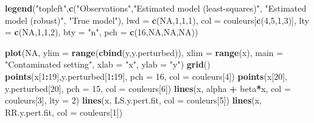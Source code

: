 \documentclass[]{book}
\newenvironment{Shaded}{\begin{snugshade}}{\end{snugshade}}
\newcommand{\DataTypeTok}[1]{\textcolor[rgb]{0.13,0.29,0.53}{#1}}
\newcommand{\DecValTok}[1]{\textcolor[rgb]{0.00,0.00,0.81}{#1}}
\newcommand{\KeywordTok}[1]{\textcolor[rgb]{0.13,0.29,0.53}{\textbf{#1}}}
\newcommand{\NormalTok}[1]{#1}
\newcommand{\OperatorTok}[1]{\textcolor[rgb]{0.81,0.36,0.00}{\textbf{#1}}}
\newcommand{\OtherTok}[1]{\textcolor[rgb]{0.56,0.35,0.01}{#1}}
\newcommand{\StringTok}[1]{\textcolor[rgb]{0.31,0.60,0.02}{#1}}
\theoremstyle{definition}
\theoremstyle{definition}
\theoremstyle{definition}
\theoremstyle{remark}
\begin{document}
{\begin{Shaded}
\begin{Highlighting}[]
\KeywordTok{legend}\NormalTok{(}\StringTok{"topleft"}\NormalTok{,}\KeywordTok{c}\NormalTok{(}\StringTok{"Observations"}\NormalTok{,}\StringTok{"Estimated model (least-squares)"}\NormalTok{,}
                   \StringTok{"Estimated model (robust)"}\NormalTok{, }\StringTok{"True model"}\NormalTok{), }
       \DataTypeTok{lwd =} \KeywordTok{c}\NormalTok{(}\OtherTok{NA}\NormalTok{,}\DecValTok{1}\NormalTok{,}\DecValTok{1}\NormalTok{,}\DecValTok{1}\NormalTok{), }\DataTypeTok{col =}\NormalTok{ couleurs[}\KeywordTok{c}\NormalTok{(}\DecValTok{4}\NormalTok{,}\DecValTok{5}\NormalTok{,}\DecValTok{1}\NormalTok{,}\DecValTok{3}\NormalTok{)],}
       \DataTypeTok{lty =} \KeywordTok{c}\NormalTok{(}\OtherTok{NA}\NormalTok{,}\DecValTok{1}\NormalTok{,}\DecValTok{1}\NormalTok{,}\DecValTok{2}\NormalTok{), }\DataTypeTok{bty =} \StringTok{"n"}\NormalTok{, }\DataTypeTok{pch =} \KeywordTok{c}\NormalTok{(}\DecValTok{16}\NormalTok{,}\OtherTok{NA}\NormalTok{,}\OtherTok{NA}\NormalTok{,}\OtherTok{NA}\NormalTok{))}

\KeywordTok{plot}\NormalTok{(}\OtherTok{NA}\NormalTok{, }\DataTypeTok{ylim =} \KeywordTok{range}\NormalTok{(}\KeywordTok{cbind}\NormalTok{(y,y.perturbed)), }\DataTypeTok{xlim =} \KeywordTok{range}\NormalTok{(x),}
     \DataTypeTok{main =} \StringTok{"Contaminated setting"}\NormalTok{, }\DataTypeTok{xlab =} \StringTok{"x"}\NormalTok{, }\DataTypeTok{ylab =} \StringTok{"y"}\NormalTok{)}
\KeywordTok{grid}\NormalTok{()}
\KeywordTok{points}\NormalTok{(x[}\DecValTok{1}\OperatorTok{:}\DecValTok{19}\NormalTok{],y.perturbed[}\DecValTok{1}\OperatorTok{:}\DecValTok{19}\NormalTok{], }\DataTypeTok{pch =} \DecValTok{16}\NormalTok{, }\DataTypeTok{col =}\NormalTok{ couleurs[}\DecValTok{4}\NormalTok{])}
\KeywordTok{points}\NormalTok{(x[}\DecValTok{20}\NormalTok{], y.perturbed[}\DecValTok{20}\NormalTok{], }\DataTypeTok{pch =} \DecValTok{15}\NormalTok{, }\DataTypeTok{col =}\NormalTok{ couleurs[}\DecValTok{6}\NormalTok{])}
\KeywordTok{lines}\NormalTok{(x, alpha }\OperatorTok{+}\StringTok{ }\NormalTok{beta}\OperatorTok{*}\NormalTok{x, }\DataTypeTok{col =}\NormalTok{ couleurs[}\DecValTok{3}\NormalTok{], }\DataTypeTok{lty =} \DecValTok{2}\NormalTok{)}
\KeywordTok{lines}\NormalTok{(x, LS.y.pert.fit, }\DataTypeTok{col =}\NormalTok{ couleurs[}\DecValTok{5}\NormalTok{])}
\KeywordTok{lines}\NormalTok{(x, RR.y.pert.fit, }\DataTypeTok{col =}\NormalTok{ couleurs[}\DecValTok{1}\NormalTok{])}


\end{Highlighting}
\end{Shaded}}
\end{document}
